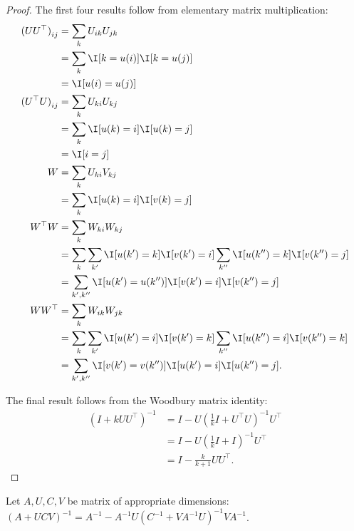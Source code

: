 \begin{proof}
  The first four results follow from elementary matrix multiplication:
  \begin{align*}
    {(UU^\top)}_{ij}
    &= \sum_{k} U_{ik} U_{jk} \\
    &= \sum_{k} \I[k = u(i)] \I[k = u(j)] \\
    &= \I[u(i) = u(j)] \\
    {(U^\top U)}_{ij}
    &= \sum_{k} U_{ki} U_{kj} \\
    &= \sum_{k} \I[u(k) = i] \I[u(k) = j] \\
    &= \I[i = j] \\
    W 
    &= \sum_{k} U_{ki} V_{kj} \\
    &= \sum_{k} \I[u(k) = i] \I[v(k) = j] \\
    W^\top W
    &= \sum_{k} W_{ki} W_{kj} \\
    &= \sum_{k} \sum_{k'} \I[u(k') = k] \I[v(k') = i] \sum_{k''} \I[u(k'') = k] \I[v(k'') = j] \\
    &= \sum_{k', k''} \I[u(k') = u(k'')] \I[v(k') = i] \I[v(k'') = j] \\
    W W^\top
    &= \sum_{k} W_{ik} W_{jk} \\
    &= \sum_{k} \sum_{k'} \I[u(k') = i] \I[v(k') = k] \sum_{k''} \I[u(k'') = i] \I[v(k'') = k] \\
    &= \sum_{k', k''} \I[v(k') = v(k'')] \I[u(k') = i] \I[u(k'') = j].
  \end{align*}

  The final result follows from the Woodbury matrix identity: 
  \begin{align*}
    {(I + k U U^\top)}^{-1}
    &= I - U {(\frac{1}{k} I +  U^\top U)}^{-1} U^\top \\
    &= I - U {(\frac{1}{k} I + I)}^{-1} U^\top \\
    &= I - \frac{k}{k+1} U U^\top.
  \end{align*}
\end{proof}

\begin{lemma}
  Let $A, U, C, V$ be matrix of appropriate dimensions: ${\left(A+UCV\right)}^{-1} = A^{-1} - A^{-1} U {\left(C^{-1}+VA^{-1}U\right)}^{-1} V A^{-1}$. 
\end{lemma}

